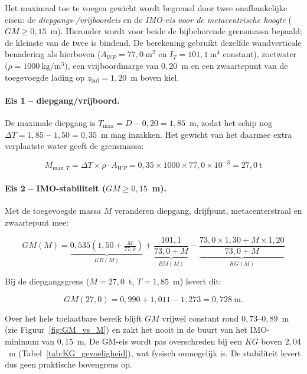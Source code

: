 Het maximaal toe te voegen gewicht wordt begrensd door twee onafhankelijke
eisen: de \emph{diepgangs-/vrijboordeis} en de \emph{IMO-eis voor de
metacentrische hoogte} ($GM \geq 0{,}15$~m). Hieronder wordt voor beide de
bijbehorende grensmassa bepaald; de kleinste van de twee is bindend. De
berekening gebruikt dezelfde wandverticale benadering als hierboven
($A_{WP} = 77{,}0\ \mathrm{m^2}$ en $I_T = 101{,}1\ \mathrm{m^4}$ constant),
zoetwater ($\rho = 1000\ \mathrm{kg/m^3}$), een vrijboordmarge van
$0{,}20$~m en een zwaartepunt van de toegevoegde lading op
$z_\mathrm{lad} = 1{,}20$~m boven kiel.

\paragraph{Eis 1 -- diepgang/vrijboord.}
De maximale diepgang is $T_\mathrm{max} = D - 0{,}20 = 1{,}85$~m,
zodat het schip nog $\Delta T = 1{,}85 - 1{,}50 = 0{,}35$~m mag inzakken.
Het gewicht van het daarmee extra verplaatste water geeft de grensmassa:

\begin{equation}
    M_{\mathrm{max},T} = \Delta T \times \rho \cdot A_{WP}
                   = 0{,}35 \times 1000 \times 77{,}0 \times 10^{-3}
                   = \boxed{27{,}0\ \mathrm{t}}
    \label{eq:Mmax}
\end{equation}

\paragraph{Eis 2 -- IMO-stabiliteit ($GM \geq 0{,}15$~m).}
Met de toegevoegde massa $M$ veranderen diepgang, drijfpunt, metacenterstraal
en zwaartepunt mee:

\begin{equation}
    GM(M) = \underbrace{0{,}535\!\left(1{,}50 + \tfrac{M}{77{,}0}\right)}_{KB(M)}
          + \underbrace{\frac{101{,}1}{73{,}0 + M}}_{BM(M)}
          - \underbrace{\frac{73{,}0 \times 1{,}30 + M \times 1{,}20}{73{,}0 + M}}_{KG(M)}
    \label{eq:GM_vanM}
\end{equation}

Bij de diepgangsgrens ($M = 27{,}0$~t, $T = 1{,}85$~m) levert dit:

\begin{equation}
    GM(27{,}0) = 0{,}990 + 1{,}011 - 1{,}273 = 0{,}728\ \mathrm{m}.
\end{equation}

Over het hele toelaatbare bereik blijft $GM$ vrijwel constant rond
$0{,}73$--$0{,}89$~m (zie Figuur~\ref{fig:GM_vs_M}) en zakt het nooit in de
buurt van het IMO-minimum van $0{,}15$~m. De GM-eis wordt pas overschreden bij
een $KG$ boven $2{,}04$~m (Tabel~\ref{tab:KG_gevoeligheid}), wat fysisch
onmogelijk is. De stabiliteit levert dus geen praktische bovengrens op.

